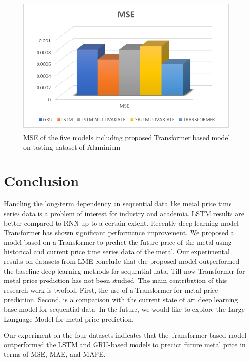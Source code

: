 \documentclass{ws-ijait}
\begin{document}
\begin{center}
	\begin{figure}[!htbp]
		\centering
		\includegraphics[width=15cm, height=7cm]{r1.png}
		\caption{MSE of the five models including proposed Transformer based model on testing dataset of Aluminium}
		\label{figr1}
	\end{figure}
\end{center}

\section{Conclusion}
Handling the long-term dependency on sequential data like metal price time series data is a problem of interest for industry and academia. LSTM results are better compared to RNN up to a certain extent. Recently deep learning model Transformer has shown significant performance improvement. We proposed a model based on a Transformer to predict the future price of the metal using historical and current price time series data of the metal. Our experimental results on datasets from LME conclude that the proposed model outperformed the baseline deep learning methods for sequential data. Till now Transformer for metal price prediction has not been studied. The main contribution of this research work is twofold. First, the use of a Transformer for metal price prediction. Second, is a comparison with the current state of art deep learning base model for sequential data. In the future, we would like to explore the Large Language Model for metal price prediction.  
\par Our experiment on the four datasets indicates that the Transformer based model outperformed the LSTM and GRU-based models to predict future metal price in terms of MSE, MAE, and MAPE. 

 

\end{document}
